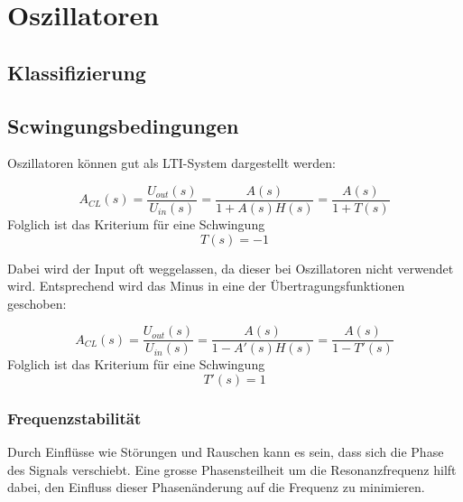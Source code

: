 \section{Oszillatoren}


\subsection{Klassifizierung}


\subsection{Scwingungsbedingungen}
Oszillatoren können gut als LTI-System dargestellt werden:

\begin{minipage}{0.34\columnwidth}
    
\end{minipage}
\hfill
\begin{minipage}{0.65\columnwidth}
    \begin{equation*}
        A_{CL}(s)
        = \frac{U_{out}(s)}{U_{in}(s)} 
        = \frac{A(s)}{1+A(s)H(s)} 
        = \frac{A(s)}{1+T(s)}
    \end{equation*}
    Folglich ist das Kriterium für eine Schwingung
    \begin{equation*}
        T(s) = -1
    \end{equation*}
\end{minipage}

Dabei wird der Input oft weggelassen, da dieser bei Oszillatoren nicht verwendet wird.
Entsprechend wird das Minus in eine der Übertragungsfunktionen geschoben:

\begin{minipage}{0.34\columnwidth}
    
\end{minipage}
\hfill
\begin{minipage}{0.65\columnwidth} 
    \begin{equation*}
        A_{CL}(s)
        = \frac{U_{out}(s)}{U_{in}(s)} 
        = \frac{A(s)}{1-A'(s)H(s)} 
        = \frac{A(s)}{1-T'(s)}
    \end{equation*}
    Folglich ist das Kriterium für eine Schwingung
    \begin{equation*}
        T'(s) = 1
    \end{equation*}
\end{minipage}

\subsubsection{Frequenzstabilität}
\begin{minipage}{0.5\columnwidth}
    
\end{minipage}
\hfill
\begin{minipage}{0.49\columnwidth}
    Durch Einflüsse wie Störungen und Rauschen kann es sein, dass sich die Phase des Signals verschiebt.
    Eine grosse Phasensteilheit um die Resonanzfrequenz hilft dabei, den Einfluss dieser Phasenänderung auf die Frequenz zu minimieren.
\end{minipage}

